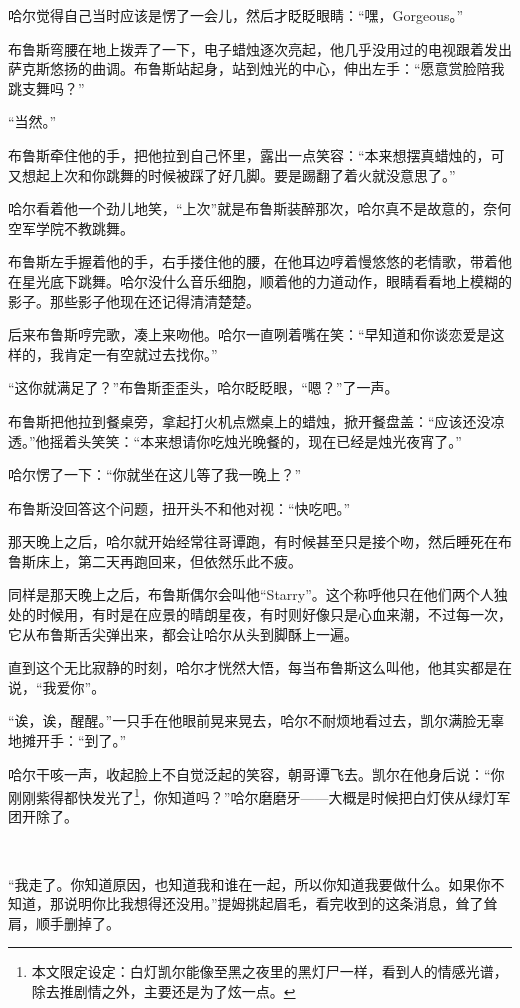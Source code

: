 \documentclass[../main]{subfiles}
\begin{document}
哈尔觉得自己当时应该是愣了一会儿，然后才眨眨眼睛：“嘿，Gorgeous。”

布鲁斯弯腰在地上拨弄了一下，电子蜡烛逐次亮起，他几乎没用过的电视跟着发出萨克斯悠扬的曲调。布鲁斯站起身，站到烛光的中心，伸出左手：“愿意赏脸陪我跳支舞吗？”

“当然。”

布鲁斯牵住他的手，把他拉到自己怀里，露出一点笑容：“本来想摆真蜡烛的，可又想起上次和你跳舞的时候被踩了好几脚。要是踢翻了着火就没意思了。”

哈尔看着他一个劲儿地笑，“上次”就是布鲁斯装醉那次，哈尔真不是故意的，奈何空军学院不教跳舞。

布鲁斯左手握着他的手，右手搂住他的腰，在他耳边哼着慢悠悠的老情歌，带着他在星光底下跳舞。哈尔没什么音乐细胞，顺着他的力道动作，眼睛看看地上模糊的影子。那些影子他现在还记得清清楚楚。

后来布鲁斯哼完歌，凑上来吻他。哈尔一直咧着嘴在笑：“早知道和你谈恋爱是这样的，我肯定一有空就过去找你。”

“这你就满足了？”布鲁斯歪歪头，哈尔眨眨眼，“嗯？”了一声。

布鲁斯把他拉到餐桌旁，拿起打火机点燃桌上的蜡烛，掀开餐盘盖：“应该还没凉透。”他摇着头笑笑：“本来想请你吃烛光晚餐的，现在已经是烛光夜宵了。”

哈尔愣了一下：“你就坐在这儿等了我一晚上？”

布鲁斯没回答这个问题，扭开头不和他对视：“快吃吧。”

那天晚上之后，哈尔就开始经常往哥谭跑，有时候甚至只是接个吻，然后睡死在布鲁斯床上，第二天再跑回来，但依然乐此不疲。

同样是那天晚上之后，布鲁斯偶尔会叫他“Starry”。这个称呼他只在他们两个人独处的时候用，有时是在应景的晴朗星夜，有时则好像只是心血来潮，不过每一次，它从布鲁斯舌尖弹出来，都会让哈尔从头到脚酥上一遍。

直到这个无比寂静的时刻，哈尔才恍然大悟，每当布鲁斯这么叫他，他其实都是在说，“我爱你”。

“诶，诶，醒醒。”一只手在他眼前晃来晃去，哈尔不耐烦地看过去，凯尔满脸无辜地摊开手：“到了。”

哈尔干咳一声，收起脸上不自觉泛起的笑容，朝哥谭飞去。凯尔在他身后说：“你刚刚紫得都快发光了\footnote[1]{本文限定设定：白灯凯尔能像至黑之夜里的黑灯尸一样，看到人的情感光谱，除去推剧情之外，主要还是为了炫一点。}，你知道吗？”哈尔磨磨牙——大概是时候把白灯侠从绿灯军团开除了。

~\

“我走了。你知道原因，也知道我和谁在一起，所以你知道我要做什么。如果你不知道，那说明你比我想得还没用。”提姆挑起眉毛，看完收到的这条消息，耸了耸肩，顺手删掉了。
\end{document}
